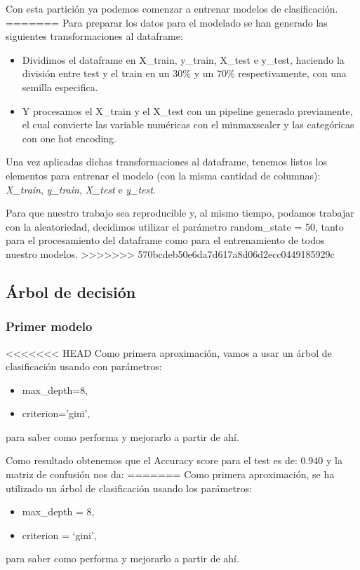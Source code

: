 \documentclass[a4paper]{article}
\begin{document}
        Con esta partición ya podemos comenzar a entrenar modelos de clasificación.
=======
        Para preparar los datos para el modelado se han generado las siguientes transformaciones al dataframe:
        \begin{itemize}
            \item  Dividimos el dataframe en X\_train, y\_train, X\_test e y\_test, haciendo la división entre test y el train en un 30\% y un 70\% respectivamente, con una semilla especifica.
            \item  Y procesamos el X\_train y el X\_test con un pipeline generado previamente, el cual convierte las variable numéricas con el minmaxscaler y las categóricas con one hot encoding.
        \end{itemize}

        Una vez aplicadas dichas transformaciones al dataframe, tenemos listos los elementos para entrenar el modelo (con la misma cantidad de columnas): \textit{X\_train}, \textit{y\_train}, \textit{X\_test} e \textit{y\_test}.

        Para que nuestro trabajo sea reproducible y, al mismo tiempo, podamos trabajar con la aleatoriedad, decidimos utilizar el parámetro random\_state = 50, tanto para el procesamiento del dataframe como para el entrenamiento de todos nuestro modelos.
>>>>>>> 570bcdeb50e6da7d617a8d06d2ecc0449185929c

    \subsection{Árbol de decisión}

        \subsubsection{Primer modelo}

<<<<<<< HEAD
            Como primera aproximación, vamos a usar un árbol de clasificación usando con parámetros:
            \begin{itemize}
                \item max\_depth=8,
                \item criterion='gini',
            \end{itemize}
            para saber como performa y mejorarlo a partir de ahí.

            Como resultado obtenemos que el Accuracy score para el test es de: 0.940 y la matriz de confusión nos da:
=======
            Como primera aproximación, se ha utilizado un árbol de clasificación usando los parámetros:
            \begin{itemize}
                \item max\_depth = 8,
                \item criterion = `gini',
            \end{itemize}
            para saber como performa y mejorarlo a partir de ahí.
 
\end{document}
